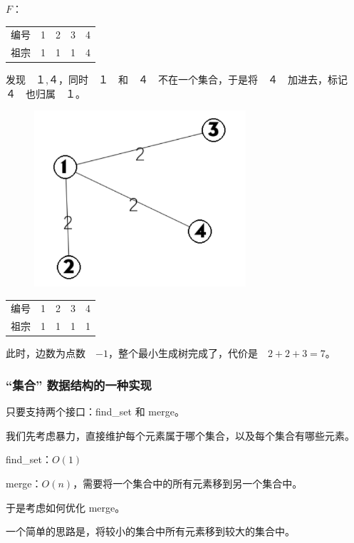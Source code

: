 $F$：

\begin{tabular}{rrrrr}
\hline
编号& 1& 2& 3& 4\\祖宗& 1& 1& 1& 4\\\hline
\end{tabular}

发现　１,４，同时　１　和　４　不在一个集合，于是将　４　加进去，标记　４　也归属　１。

\begin{figure}[htbp]
\centering
\includegraphics[width=0.7\textwidth]{docs/graph/images/mst4.png} 

\end{figure}

\begin{tabular}{rrrrr}
\hline
编号& 1& 2& 3& 4\\祖宗& 1& 1& 1& 1\\\hline
\end{tabular}

此时，边数为点数　$-1$，整个最小生成树完成了，代价是　$2+2+3=7$。

\subsubsection{“集合” 数据结构的一种实现}

只要支持两个接口：find\_set 和 merge。

我们先考虑暴力，直接维护每个元素属于哪个集合，以及每个集合有哪些元素。

find\_set：$O(1)$

merge：$O(n)$，需要将一个集合中的所有元素移到另一个集合中。

于是考虑如何优化 merge。

一个简单的思路是，将较小的集合中所有元素移到较大的集合中。

